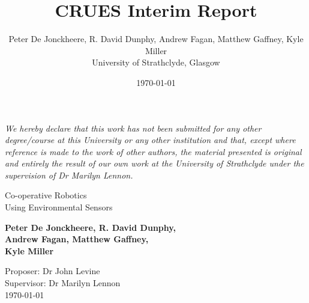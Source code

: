 
\title{CRUES Interim Report}
\author{Peter De Jonckheere, R. David Dunphy, Andrew Fagan, Matthew Gaffney,
Kyle Miller\\University of Strathclyde, Glasgow}
\date{\today}

\thispagestyle{empty}
\begin{center}

    \textit{
        We hereby declare that this work has not been submitted for any
        other degree/course at this University or any other institution
        and that, except where reference is made to the work of other
        authors, the material presented is original and entirely the
        result of our own work at the University of Strathclyde under the
        supervision of Dr Marilyn Lennon.
    }

    \vfill

    \large
    Co-operative Robotics\\Using Environmental Sensors

    \vspace{0.2cm}

    \textbf{Peter De Jonckheere, R. David Dunphy,\\Andrew Fagan,
        Matthew Gaffney,\\Kyle Miller}

    \vspace{0.3cm}

    \normalsize
    Proposer: Dr John Levine\\
    Supervisor: Dr Marilyn Lennon\\
    \today

\end{center}
\restoregeometry{}
